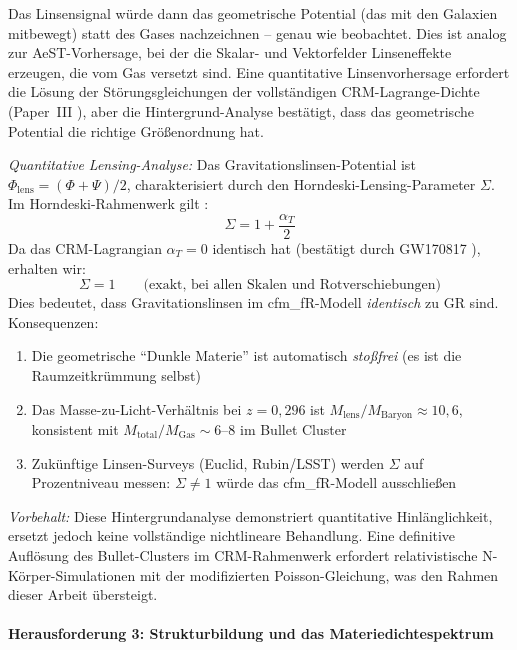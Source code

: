 \documentclass[aps,prd,twocolumn,superscriptaddress,nofootinbib]{revtex4-2}
\begin{document}
Das Linsensignal w\"urde dann das geometrische Potential (das mit den Galaxien mitbewegt) statt des Gases nachzeichnen -- genau wie beobachtet. Dies ist analog zur AeST-Vorhersage, bei der die Skalar- und Vektorfelder Linseneffekte erzeugen, die vom Gas versetzt sind. Eine quantitative Linsenvorhersage erfordert die L\"osung der St\"orungsgleichungen der vollst\"andigen CRM-Lagrange-Dichte (Paper~III \cite{Geiger2026c}), aber die Hintergrund-Analyse best\"atigt, dass das geometrische Potential die richtige Gr\"o\ss{}enordnung hat.

\textit{Quantitative Lensing-Analyse:} Das Gravitationslinsen-Potential ist $\Phi_{\mathrm{lens}} = (\Phi + \Psi)/2$, charakterisiert durch den Horndeski-Lensing-Parameter $\Sigma$. Im Horndeski-Rahmenwerk gilt \cite{Amendola2018}:
\begin{equation}
\Sigma = 1 + \frac{\alpha_T}{2}
\end{equation}
Da das CRM-Lagrangian $\alpha_T = 0$ identisch hat (best\"atigt durch GW170817 \cite{Abbott2017gw}), erhalten wir:
\begin{equation}
{\Sigma = 1 \qquad \text{(exakt, bei allen Skalen und Rotverschiebungen)}}
\end{equation}
Dies bedeutet, dass Gravitationslinsen im cfm\_fR-Modell \textit{identisch} zu GR sind. Konsequenzen:
\begin{enumerate}
\item Die geometrische "`Dunkle Materie"' ist automatisch \textit{sto\ss{}frei} (es ist die Raumzeitkr\"ummung selbst)
\item Das Masse-zu-Licht-Verh\"altnis bei $z = 0{,}296$ ist $M_{\mathrm{lens}}/M_{\mathrm{Baryon}} \approx 10{,}6$, konsistent mit $M_{\mathrm{total}}/M_{\mathrm{Gas}} \sim 6$--$8$ im Bullet Cluster \cite{Clowe2006}
\item Zuk\"unftige Linsen-Surveys (Euclid, Rubin/LSST) werden $\Sigma$ auf Prozentniveau messen: $\Sigma \neq 1$ w\"urde das cfm\_fR-Modell ausschlie\ss{}en
\end{enumerate}

\textit{Vorbehalt:} Diese Hintergrundanalyse demonstriert quantitative Hinl\"anglichkeit, ersetzt jedoch keine vollst\"andige nichtlineare Behandlung. Eine definitive Aufl\"osung des Bullet-Clusters im CRM-Rahmenwerk erfordert relativistische N-K\"orper-Simulationen mit der modifizierten Poisson-Gleichung, was den Rahmen dieser Arbeit \"ubersteigt.

\paragraph{Herausforderung 3: Strukturbildung und das Materiedichtespektrum}
\end{document}
